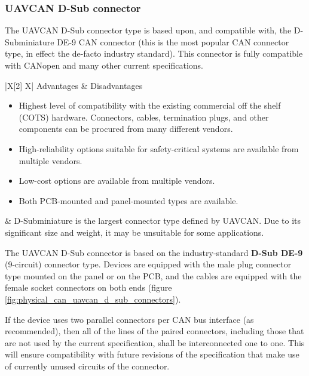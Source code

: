 \clearpage  %
\subsubsection{UAVCAN D-Sub connector}

The UAVCAN D-Sub connector type is based upon, and compatible with, the D-Subminiature DE-9 CAN connector
(this is the most popular CAN connector type, in effect the de-facto industry standard).
This connector is fully compatible with CANopen and many other current specifications.

{
\NoLeftSkip
\begin{UAVCANCompactTable}{|X[2] X|}
    Advantages & Disadvantages \\
    \begin{itemize}
        \item Highest level of compatibility with the existing commercial off the shelf (COTS) hardware.
        Connectors, cables, termination plugs, and other components can be procured from many different vendors.
        \item High-reliability options suitable for safety-critical systems are available from multiple vendors.
        \item Low-cost options are available from multiple vendors.
        \item Both PCB-mounted and panel-mounted types are available.
    \end{itemize}
    &
    D-Subminiature is the largest connector type defined by UAVCAN.
    Due to its significant size and weight, it may be unsuitable for some applications.
\end{UAVCANCompactTable}
}

The UAVCAN D-Sub connector is based on the industry-standard \textbf{D-Sub DE-9} (9-circuit) connector type.
Devices are equipped with the male plug connector type mounted on the panel or on the PCB,
and the cables are equipped with the female socket connectors on both ends
(figure \ref{fig:physical_can_uavcan_d_sub_connectors}).

If the device uses two parallel connectors per CAN bus interface (as recommended),
then all of the lines of the paired connectors,
including those that are not used by the current specification,
shall be interconnected one to one.
This will ensure compatibility with future revisions of the specification that make use of
currently unused circuits of the connector.

